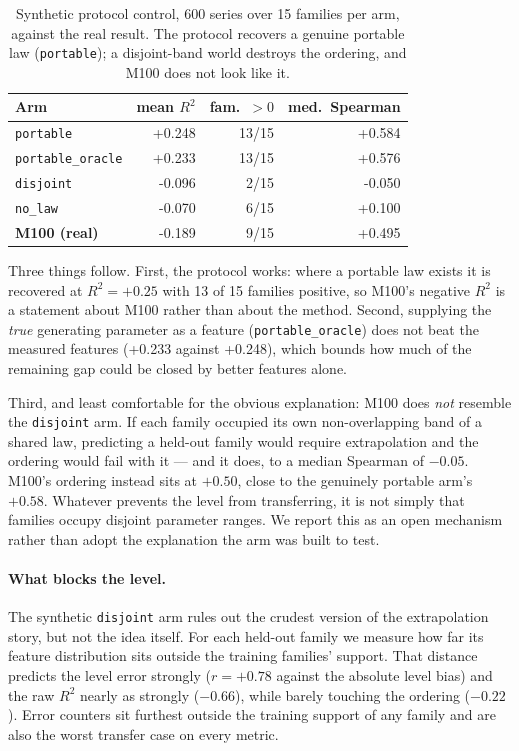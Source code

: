 \documentclass[11pt,a4paper]{article}
\newcommand{\num}[1]{#1}
\begin{document}
\begin{table}[t]
\centering
\caption{Synthetic protocol control, \num{600} series over \num{15} families
per arm, against the real result. The protocol recovers a genuine portable law
(\texttt{portable}); a disjoint-band world destroys the ordering, and M100 does
not look like it.}
\label{tab:protocol}
\small
\begin{tabular}{lrrr}
\toprule
Arm & mean \(R^2\) & fam.\ \(>0\) & med.\ Spearman \\
\midrule
\texttt{portable}     & \num{+0.248} & 13/15 & \num{+0.584} \\
\texttt{portable\_oracle} & \num{+0.233} & 13/15 & \num{+0.576} \\
\texttt{disjoint}     & \num{-0.096} & 2/15  & \num{-0.050} \\
\texttt{no\_law}       & \num{-0.070} & 6/15  & \num{+0.100} \\
\midrule
\textbf{M100 (real)}  & \num{-0.189} & 9/15  & \num{+0.495} \\
\bottomrule
\end{tabular}
\end{table}

Three things follow. First, the protocol works: where a portable law exists it
is recovered at \(R^2 = +0.25\) with \num{13} of \num{15} families positive,
so M100's negative \(R^2\) is a statement about M100 rather than about the
method. Second, supplying the \emph{true} generating parameter as a feature
(\texttt{portable\_oracle}) does not beat the measured features
(\num{+0.233} against \num{+0.248}), which bounds how much of the remaining gap
could be closed by better features alone.

Third, and least comfortable for the obvious explanation: M100 does \emph{not}
resemble the \texttt{disjoint} arm. If each family occupied its own
non-overlapping band of a shared law, predicting a held-out family would require
extrapolation and the ordering would fail with it --- and it does, to a median
Spearman of \(-0.05\). M100's ordering instead sits at \(+0.50\), close to the
genuinely portable arm's \(+0.58\). Whatever prevents the level from
transferring, it is not simply that families occupy disjoint parameter ranges.
We report this as an open mechanism rather than adopt the explanation the arm
was built to test.

\paragraph{What blocks the level.} The synthetic \texttt{disjoint} arm rules
out the crudest version of the extrapolation story, but not the idea itself. For
each held-out family we measure how far its feature distribution sits outside
the training families' support. That distance predicts the level error strongly
(\(r=+0.78\) against the absolute level bias) and the raw \(R^2\) nearly as
strongly (\(-0.66\)), while barely touching the ordering (\(-0.22\)). Error
counters sit furthest outside the training support of any family and are also
the worst transfer case on every metric.
\end{document}
